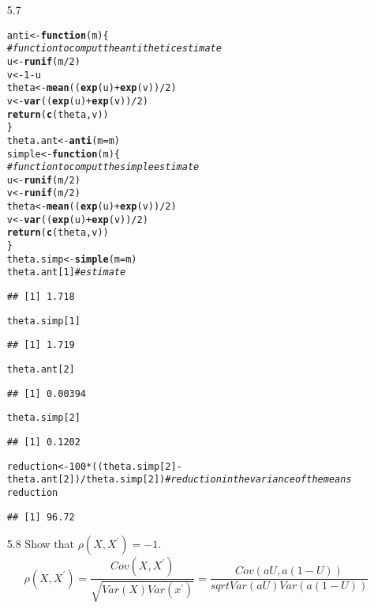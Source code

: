 \documentclass{article}\usepackage[]{graphicx}\usepackage[]{color}
\makeatletter
\newcommand{\hlcom}[1]{\textcolor[rgb]{0.678,0.584,0.686}{\textit{#1}}}%
\newcommand{\hlkwd}[1]{\textcolor[rgb]{0.737,0.353,0.396}{\textbf{#1}}}%
\newenvironment{kframe}{%
 \def\at@end@of@kframe{}%
 \ifinner\ifhmode%
  \def\at@end@of@kframe{\end{minipage}}%
  \begin{minipage}{\columnwidth}%
 \fi\fi%
 \def\FrameCommand##1{\hskip\@totalleftmargin \hskip-\fboxsep
 \colorbox{shadecolor}{##1}\hskip-\fboxsep
     \hskip-\linewidth \hskip-\@totalleftmargin \hskip\columnwidth}%
 \MakeFramed {\advance\hsize-\width
   \@totalleftmargin\z@ \linewidth\hsize
   \@setminipage}}%
 {\par\unskip\endMakeFramed%
 \at@end@of@kframe}
\newenvironment{knitrout}{}{} %
\makeatother
\begin{document}
\begin{itemize}
\item[5.7]
\begin{knitrout}
\color{fgcolor}\begin{kframe}
\begin{alltt}
anti <- \hlkwd{function}(m) \{
\hlcom{    #function to comput the antithetic estimate}
    u <- \hlkwd{runif}(m/2)
    v <- 1 - u
    theta <- \hlkwd{mean}((\hlkwd{exp}(u) + \hlkwd{exp}(v))/2)
    v <- \hlkwd{var}((\hlkwd{exp}(u) + \hlkwd{exp}(v))/2)
    \hlkwd{return}(\hlkwd{c}(theta, v))
\}
theta.ant <- \hlkwd{anti}(m = m)
simple <- \hlkwd{function}(m) \{
\hlcom{    #function to comput the simple estimate}
    u <- \hlkwd{runif}(m/2)
    v <- \hlkwd{runif}(m/2)
    theta <- \hlkwd{mean}((\hlkwd{exp}(u) + \hlkwd{exp}(v))/2)
    v <- \hlkwd{var}((\hlkwd{exp}(u) + \hlkwd{exp}(v))/2)
    \hlkwd{return}(\hlkwd{c}(theta, v))
\}
theta.simp <- \hlkwd{simple}(m = m)
theta.ant[1]  \hlcom{#estimate}
\end{alltt}
\begin{verbatim}
## [1] 1.718
\end{verbatim}
\begin{alltt}
theta.simp[1]
\end{alltt}
\begin{verbatim}
## [1] 1.719
\end{verbatim}
\begin{alltt}
theta.ant[2]
\end{alltt}
\begin{verbatim}
## [1] 0.00394
\end{verbatim}
\begin{alltt}
theta.simp[2]
\end{alltt}
\begin{verbatim}
## [1] 0.1202
\end{verbatim}
\begin{alltt}

reduction <- 100 * ((theta.simp[2] - theta.ant[2])/theta.simp[2])  \hlcom{#reduction in the variance of the means}
reduction
\end{alltt}
\begin{verbatim}
## [1] 96.72
\end{verbatim}
\end{kframe}
\end{knitrout}

\item[5.8] Show that $\rho(X,X^{\prime})=-1$.\\
$$\rho(X,X^{\prime})= \frac{Cov(X,X^{\prime})}{\sqrt{Var(X)Var(x^{\prime})}} = \frac{Cov(aU,a(1-U))}{sqrt{Var(aU)Var(a(1-U))}}$$


\end{itemize}
\end{document}
